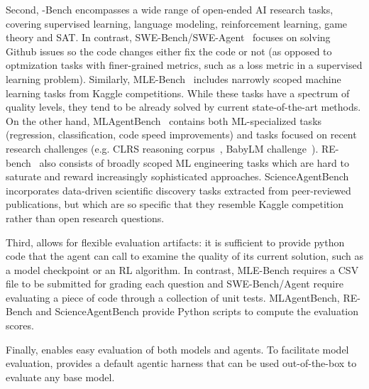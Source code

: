 Second, \mlgym-Bench encompasses a wide range of open-ended AI research tasks, covering supervised learning, language modeling, reinforcement learning, game theory and SAT.  
In contrast, SWE-Bench/SWE-Agent~\citep{yangSWEagentAgentComputerInterfaces2024} focuses on solving Github issues so the code changes either fix the code or not (as opposed to optmization tasks with finer-grained metrics, such as a loss metric in a supervised learning problem).
%
Similarly, MLE-Bench~\citep{chanMLEbenchEvaluatingMachine2024} includes narrowly scoped machine learning tasks from Kaggle competitions.
% 
While these tasks have a spectrum of quality levels, they tend to be already solved by current state-of-the-art methods. 
On the other hand, MLAgentBench~\citep{huangMLAgentBenchEvaluatingLanguage2024} contains both ML-specialized tasks (regression, classification, code speed improvements) and tasks focused on recent research challenges (e.g. CLRS reasoning corpus~\citep{velivckovic2022clrs}, BabyLM challenge~\citep{oba2023babylm}).
RE-bench~\citep{rebench-metr} also consists of broadly scoped ML engineering tasks which are hard to saturate and reward increasingly sophisticated approaches.
ScienceAgentBench~\citep{chenScienceAgentBenchRigorousAssessment2024} incorporates data-driven scientific discovery tasks extracted from peer-reviewed publications, but which are so specific that they resemble Kaggle competition rather than open research questions. 

Third, \mlgym allows for flexible evaluation artifacts: it is sufficient to provide python code that the agent can call to examine the quality of its current solution, such as a model checkpoint or an RL algorithm.
In contrast, MLE-Bench requires a CSV file to be submitted for grading each question and SWE-Bench/Agent require evaluating a piece of code through a collection of unit tests. MLAgentBench, RE-Bench and ScienceAgentBench provide Python scripts to compute the evaluation scores.

Finally, \mlgym enables easy evaluation of both models and agents. To facilitate model evaluation, \mlgym provides a default agentic harness that can be used out-of-the-box to evaluate any base model.

